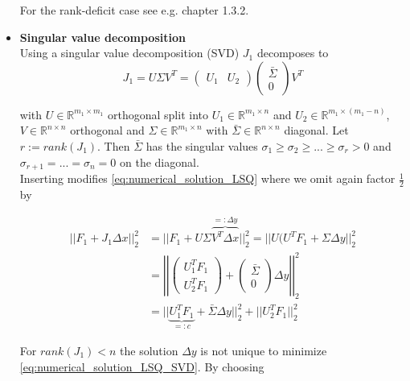 \documentclass{scrartcl}[12pt, halfparskip]
\numberwithin{equation}{section}
\numberwithin{figure}{section}
\numberwithin{table}{section}
\begin{document}
\begin{itemize}
	For the rank-deficit case see e.g. \cite{numerical_methods_lsq_Bjorck} chapter 1.3.2.
		
		
		
	\item \textbf{Singular value decomposition} \\
	Using a singular value decomposition (SVD) $J_1$ decomposes to
	\begin{equation}
		J_1 = U \Sigma V^T =
		\begin{pmatrix}
			U_1 & U_2
		\end{pmatrix}
		\begin{pmatrix}
			\bar{\Sigma} \\
			0
		\end{pmatrix}
			V^T
	\end{equation}
	
	with $U \in \mathbb{R}^{m_1 \times m_1}$ orthogonal split into $U_1 \in \mathbb{R}^{m_1 \times n}$ and $U_2 \in \mathbb{R}^{m_1 \times (m_1 - n)}$, $V \in \mathbb{R}^{n \times n}$ orthogonal and $\Sigma \in \mathbb{R}^{m_1 \times n}$ with $\bar{\Sigma} \in \mathbb{R}^{n \times n}$ diagonal. Let $r := rank(J_1)$. Then $\bar{\Sigma}$ has the singular values $\sigma_1 \ge \sigma_2 \ge ... \ge \sigma_r > 0$ and $\sigma_{r+1}=...=\sigma_{n} = 0$ on the diagonal. \\
	Inserting modifies \cref{eq:numerical_solution_LSQ} where we omit again factor $\frac{1}{2}$ by
	
	\begin{align}
		|| F_1 + J_1 \Delta x ||_2^2 & = || F_1 + U \Sigma \overbrace{V^T \Delta x}^{=: \Delta y} ||_2^2 = || U ( U^T F_1 + \Sigma \Delta y ||_2^2 \label{eq:numerical_solution_LSQ_SVD} \\
		& = \left| \left| \begin{pmatrix}
		U_1^T F_1 \\
		U_2^T F_1
		\end{pmatrix} + 
		\begin{pmatrix}
		\bar{\Sigma} \\
		0
		\end{pmatrix}
		\Delta y \right| \right|_2^2 \nonumber \\
		& = || \underbrace{U_1^T F_1}_{=: c} + \bar{\Sigma} \Delta y ||_2^2 + || U_2^T F_1 ||_2^2 \nonumber
	\end{align}
	
	For $rank(J_1) < n$ the solution $\Delta y$ is not unique to minimize \cref{eq:numerical_solution_LSQ_SVD}. By choosing
	

\end{itemize}
\end{document}
